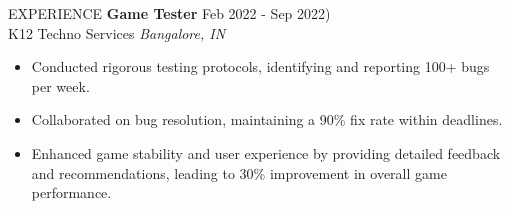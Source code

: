 \documentclass{resume} %
\begin{document}
\begin{rSection}{EXPERIENCE}
  \textbf{Game Tester} \hfill Feb 2022 - Sep 2022)\\
K12 Techno Services \hfill \textit{Bangalore, IN }
 \begin{itemize}
    \itemsep -3pt {} 
     \item Conducted rigorous testing protocols, identifying and
reporting 100+ bugs per week.
     \item Collaborated on bug resolution, maintaining a 90\% fix
rate within deadlines.
    \item Enhanced game stability and user experience by providing detailed feedback and recommendations, leading to 30\% improvement in overall game performance.
    \vspace{1em}
 \end{itemize}

\end{rSection} 
\end{document}
